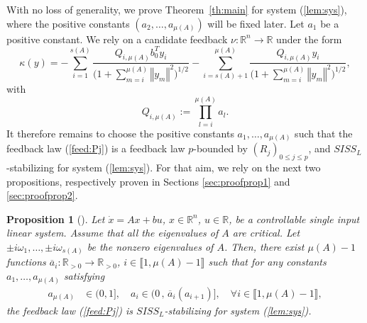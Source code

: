 \documentclass[letterpaper, 10pt]{article}
\newtheorem{propo}{Proposition}
\newcommand{\rref}[1]{(\ref{#1})}
\newcommand{\norme}[1]{\left\Vert #1\right\Vert}
\newcommand{\reels}{\mathbb{R}}
\begin{document}
With no loss of generality, we prove Theorem~\ref{th:main} for system \rref{lem:sys}, where the positive constants $(a_2, \ldots , a_{\mu(A)})$ will be fixed later. Let $a_1 $ be a positive constant. We rely on a candidate feedback $\nu:\reels^n\rightarrow\reels$ under the form 
\begin{equation}
\label{feed:Pj}
\kappa(y) =  - \sum\limits_{i=1}^{s(A)}  \frac{ Q_{i,\mu(A)} b_0^T y_i}{\Big(1 + \sum\limits_{m=i}^{\mu(A)} \norme{y_m}^2 \Big)^{1/2}}  - \sum\limits_{i=s(A)+1}^{\mu(A)}  \frac{Q_{i,\mu(A)} y_i }{\Big( 1 + \sum\limits_{m=i}^{\mu(A)} \norme{y_m}^2 \Big)^{1/2}},
\end{equation} 
with 
\begin{equation}
\label{def:consA}
Q_{i,\mu(A)} := \prod\limits_{l=i}^{\mu(A)} a_l.
\end{equation} 
It therefore remains to choose the positive constants $a_1 , \ldots , a_{\mu(A)}$ such that the feedback law \rref{feed:Pj} is a feedback law $p$-bounded by $(R_j)_{0 \leq j \leq p}$, and  $SISS_L$-stabilizing for system \rref{lem:sys}. For that aim, we rely on the next two propositions, respectively proven in Sections \ref{sec:proofprop1} and \ref{sec:proofprop2}. 

\begin{propo}[]
\label{prop:SISSl}
Let $\dot{x}=Ax + b u $, $x \in \reels^n$, $u\in\reels$, be a controllable single input linear system. Assume that all the eigenvalues of $A$ are critical. Let $ \pm i \omega_1, \ldots , \pm i \omega_{s(A)} $ be the nonzero eigenvalues of $A$. Then, there exist $\mu(A) -1 $ functions $\overline{a}_i : \reels_{>0} \rightarrow \reels_{>0}$, $i \in \llbracket 1 ,\mu(A) -1 \rrbracket$ such that for any constants $a_1 , \ldots , a_{\mu(A)} $ satisfying
\begin{align*}
  a_{\mu(A)} &\in (0, 1], \quad a_i \in (0\,,\, \overline{a}_i (a_{i+1})] , \quad \forall i  \in \llbracket 1 ,\mu(A)-1 \rrbracket,
\end{align*}
 the feedback law \rref{feed:Pj} is $SISS_L$-stabilizing for system \rref{lem:sys}.
\end{propo}
\end{document}
